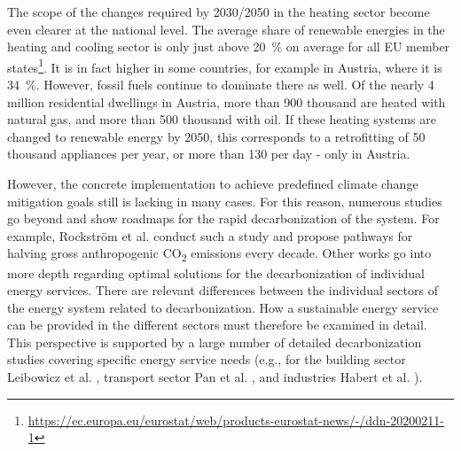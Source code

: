 The scope of the changes required by 2030/2050 in the heating sector become even clearer at the national level. The average share of renewable energies in the heating and cooling sector is only just above \SI{20}{\%} on average for all EU member states\footnote{\url{https://ec.europa.eu/eurostat/web/products-eurostat-news/-/ddn-20200211-1}}. It is in fact higher in some countries, for example in Austria, where it is \SI{34}{\%}. However, fossil fuels continue to dominate there as well. Of the nearly 4 million residential dwellings in Austria, more than 900 thousand are heated with natural gas, and more than 500 thousand with oil. If these heating systems are changed to renewable energy by 2050, this corresponds to a retrofitting of 50 thousand appliances per year, or more than 130 per day - only in Austria.\newline 

However, the concrete implementation to achieve predefined climate change mitigation goals still is lacking in many cases. For this reason, numerous studies go beyond and show roadmaps for the rapid decarbonization of the system. For example, Rockstr{\"o}m et al. \cite{rockstrom2017roadmap} conduct such a study and propose pathways for halving gross anthropogenic CO\textsubscript{2} emissions every decade. Other works go into more depth regarding optimal solutions for the decarbonization of individual energy services. There are relevant differences between the individual sectors of the energy system related to decarbonization. How a sustainable energy service can be provided in the different sectors must therefore be examined in detail. This perspective is supported by a large number of detailed decarbonization studies covering specific energy service needs (e.g., for the building sector Leibowicz et al. \cite{leibowicz2018optimal}, transport sector Pan et al. \cite{pan2018decarbonization}, and industries Habert et al. \cite{habert2020environmental}).\newline

